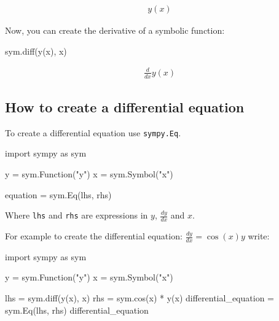 \begin{equation*}
\begin{split}\displaystyle y{\left(x \right)}\end{split}
\end{equation*}




Now, you can create the derivative of a symbolic function:




\begin{pyin}
sym.diff(y(x), x)
\end{pyin}




\begin{equation*}
\begin{split}\displaystyle \frac{d}{d x} y{\left(x \right)}\end{split}
\end{equation*}




\subsection{How to create a differential equation}
\label{\detokenize{tools-for-mathematics/09-differential-equations/how/main:how-to-create-a-differential-equation}}

To create a differential equation use \texttt{sympy.Eq}.


\begin{api}
import sympy as sym

y = sym.Function("y")
x = sym.Symbol("x")

equation = sym.Eq(lhs, rhs)
\end{api}



Where \texttt{lhs} and \texttt{rhs} are expressions in \(y\), \(\frac{dy}{dx}\) and \(x\).


For example to create the differential equation: \(\frac{dy}{dx} = \cos(x) y\)
write:




\begin{pyin}
import sympy as sym

y = sym.Function("y")
x = sym.Symbol("x")

lhs = sym.diff(y(x), x)
rhs = sym.cos(x) * y(x)
differential_equation = sym.Eq(lhs, rhs)
differential_equation
\end{pyin}




